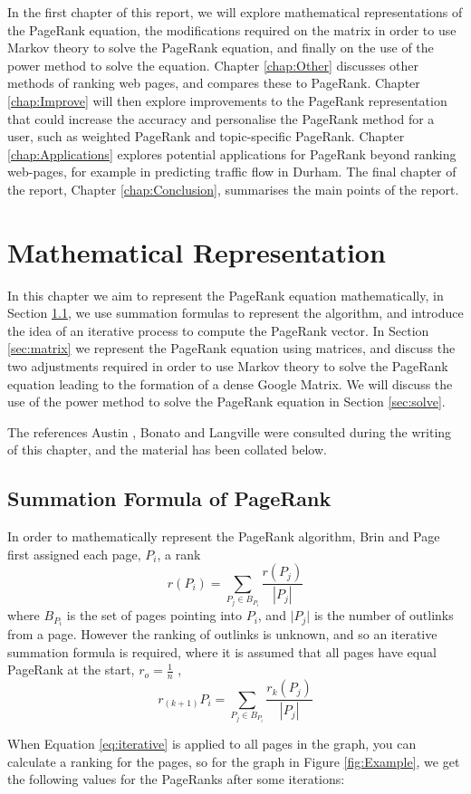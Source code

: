 \documentclass[11pt]{report}
\newcommand{\myequations}[1]{%
\addcontentsline{equ}{myequations}{\protect\numberline{\theequation}#1}\par}
\begin{document}
In the first chapter of this report, we will explore mathematical representations of the PageRank equation, the modifications required on the matrix in order to use Markov theory to solve the PageRank equation, and finally on the use of the power method to solve the equation. Chapter \ref{chap:Other} discusses other methods of ranking web pages, and compares these to PageRank. Chapter \ref{chap:Improve} will then explore improvements to the PageRank representation that could increase the accuracy and personalise the PageRank method for a user, such as weighted PageRank and topic-specific PageRank. Chapter \ref{chap:Applications} explores potential applications for PageRank beyond ranking web-pages, for example in predicting traffic flow in Durham. The final chapter of the report, Chapter \ref{chap:Conclusion}, summarises the main points of the report.



\chapter{Mathematical Representation} \label{chap:Math}
In this chapter we aim to represent the PageRank equation mathematically, in Section \ref{sec:summ}, we use summation formulas to represent the algorithm, and introduce the idea of an iterative process to compute the PageRank vector. In Section \ref{sec:matrix} we represent the PageRank equation using matrices, and discuss the two adjustments required in order to use Markov theory to solve the PageRank equation leading to the formation of a dense Google Matrix. We will discuss the use of the power method to solve the PageRank equation in Section \ref{sec:solve}.

The references Austin \cite{austin}, Bonato \cite{bonato} and Langville \cite{langville} were consulted during the writing of this chapter, and the material has been collated below.  

\section{Summation Formula of PageRank} \label{sec:summ}
In order to mathematically represent the PageRank algorithm, Brin and Page first assigned each page, $P_i$, a rank
\begin{equation}
r(P_i) = \displaystyle \sum_{P_j\in B_{P_i }} \frac{r(P_j)}{|P_j|}
\end{equation} where $B_{P_i}$ is the set of pages pointing into $P_i$, and $\vert P_j\vert$ is the number of outlinks from a page. However the ranking of outlinks is unknown, and so an iterative summation formula is required, where it is assumed that all pages have equal PageRank at the start, \(r_o = \frac{1}{n}\) , \begin{equation} \label{eq:iterative}
r_{(k+1)}P_i = \displaystyle \sum_{P_j\in B_{P_i }}\frac{r_k(P_j)}{|P_j|}
\end{equation} 
\myequations{Iterative Summation formula for PR}
When Equation \eqref{eq:iterative} is applied to all pages in the graph, you can calculate a ranking for the pages, so for the graph in Figure \ref{fig:Example}, we get the following values for the PageRanks after some iterations: 
\end{document}
